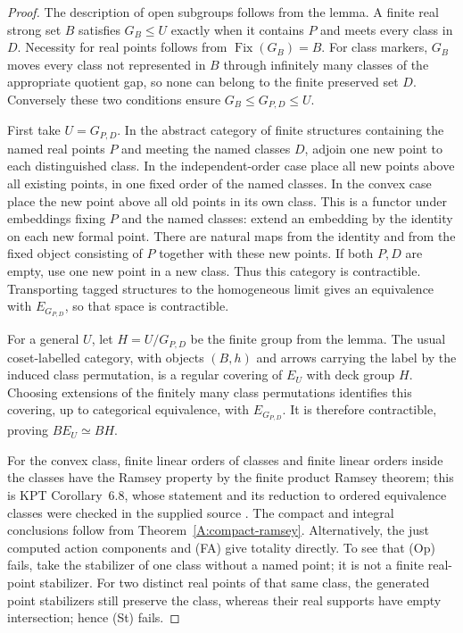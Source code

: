 \begin{proof}
The description of open subgroups follows from the lemma. A finite
real strong set $B$ satisfies $G_B\leq U$ exactly when it contains
$P$ and meets every class in $D$. Necessity for real points follows
from $\operatorname{Fix}(G_B)=B$. For class markers, $G_B$ moves
every class not represented in $B$ through infinitely many classes
of the appropriate quotient gap, so none can belong to the finite
preserved set $D$. Conversely these two conditions ensure
$G_B\leq G_{P,D}\leq U$.

First take $U=G_{P,D}$. In the abstract category of finite structures
containing the named real points $P$ and meeting the named classes
$D$, adjoin one new point to each distinguished class. In the
independent-order case place all new points above all existing
points, in one fixed order of the named classes. In the convex case
place the new point above all old points in its own class. This is
a functor under embeddings fixing $P$ and the named classes: extend
an embedding by the identity on each new formal point. There are
natural maps from the identity and from the fixed object consisting
of $P$ together with these new points. If both $P,D$ are empty,
use one new point in a new class. Thus this category is contractible.
Transporting tagged structures to the homogeneous limit gives an
equivalence with $E_{G_{P,D}}$, so that space is contractible.

For a general $U$, let $H=U/G_{P,D}$ be the finite group from the
lemma. The usual coset-labelled category, with objects $(B,h)$ and
arrows carrying the label by the induced class permutation, is a
regular covering of $E_U$ with deck group $H$. Choosing extensions
of the finitely many class permutations identifies this covering,
up to categorical equivalence, with $E_{G_{P,D}}$. It is therefore
contractible, proving $BE_U\simeq BH$.

For the convex class, finite linear orders of classes and finite
linear orders inside the classes have the Ramsey property by the
finite product Ramsey theorem; this is KPT Corollary~6.8, whose
statement and its reduction to ordered equivalence classes were
checked in the supplied source \cite{ABKPT2005}. The compact and
integral conclusions follow from Theorem~\ref{A:compact-ramsey}.
Alternatively, the just computed action components and (FA) give
totality directly. To see that (Op) fails, take the stabilizer of
one class without a named point; it is not a finite real-point
stabilizer. For two distinct real points of that same class,
the generated point stabilizers still preserve the class, whereas
their real supports have empty intersection; hence (St) fails.
\end{proof}

